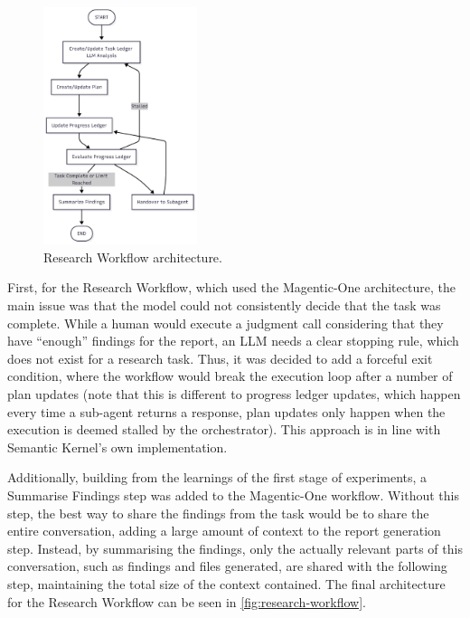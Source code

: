 \documentclass[a4paper]{report}
\begin{document}
\begin{figure}[h]
\centering
\includegraphics[width=0.4\textwidth]{images/research-workflow.png}
\caption{Research Workflow architecture.}
\label{fig:research-workflow}
\end{figure}

First, for the Research Workflow, which used the Magentic-One architecture, the main issue was that the model could not consistently decide that the task was complete. While a human would execute a judgment call considering that they have ``enough'' findings for the report, an LLM needs a clear stopping rule, which does not exist for a research task. Thus, it was decided to add a forceful exit condition, where the workflow would break the execution loop after a number of plan updates (note that this is different to progress ledger updates, which happen every time a sub-agent returns a response, plan updates only happen when the execution is deemed stalled by the orchestrator). This approach is in line with Semantic Kernel's own implementation.

Additionally, building from the learnings of the first stage of experiments, a Summarise Findings step was added to the Magentic-One workflow. Without this step, the best way to share the findings from the task would be to share the entire conversation, adding a large amount of context to the report generation step. Instead, by summarising the findings, only the actually relevant parts of this conversation, such as findings and files generated, are shared with the following step, maintaining the total size of the context contained. The final architecture for the Research Workflow can be seen in \autoref{fig:research-workflow}.
\end{document}
